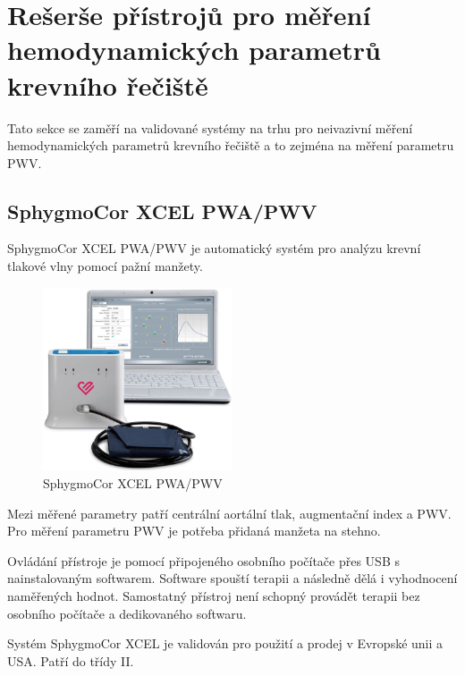 \section{Rešerše přístrojů pro měření hemodynamických parametrů krevního řečiště}
Tato sekce se zaměří na validované systémy na trhu pro neivazivní měření hemodynamických parametrů krevního řečiště a to zejména na měření parametru PWV.

\subsection{SphygmoCor XCEL PWA/PWV}
SphygmoCor XCEL PWA/PWV je automatický systém pro analýzu krevní tlakové vlny pomocí pažní manžety.

\begin{figure}[H]
    \caption{SphygmoCor XCEL PWA/PWV}
    \includegraphics[width=0.5\textwidth]{pictures/XCEL_System.jpg}
\end{figure}
Mezi měřené parametry patří centrální aortální tlak, augmentační index a PWV. Pro měření parametru PWV je potřeba přidaná manžeta na stehno.
\par
Ovládání přístroje je pomocí připojeného osobního počítače přes USB s nainstalovaným softwarem. Software spouští terapii a následně dělá i vyhodnocení naměřených hodnot. Samostatný přístroj není schopný provádět terapii bez osobního počítače a dedikovaného softwaru.
\par
Systém SphygmoCor XCEL je validován pro použití a prodej v Evropské unii a USA. Patří do třídy II.

